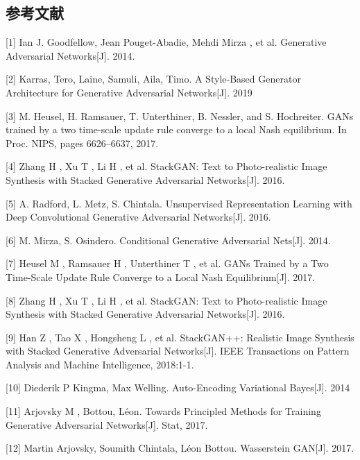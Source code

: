 \documentclass{article}
\begin{document}
\begin{CJK*}{UTF8}{gbsn}
\section*{参考文献}

\small

[1] Ian J. Goodfellow, Jean Pouget-Abadie, Mehdi Mirza , et al. Generative Adversarial Networks[J]. 2014.

[2] Karras, Tero, Laine, Samuli, Aila, Timo. A Style-Based Generator Architecture for Generative Adversarial Networks[J]. 2019

[3] M. Heusel, H. Ramsauer, T. Unterthiner, B. Nessler, and S. Hochreiter. GANs trained by a two time-scale update rule converge to a local Nash equilibrium. In Proc. NIPS, pages 6626–6637, 2017.

[4] Zhang H , Xu T , Li H , et al. StackGAN: Text to Photo-realistic Image Synthesis with Stacked Generative Adversarial Networks[J]. 2016.

[5] A. Radford, L. Metz, S. Chintala. Unsupervised Representation Learning with Deep Convolutional Generative Adversarial Networks[J]. 2016.

[6] M. Mirza, S. Osindero. Conditional Generative Adversarial Nets[J]. 2014.

[7] Heusel M , Ramsauer H , Unterthiner T , et al. GANs Trained by a Two Time-Scale Update Rule Converge to a Local Nash Equilibrium[J]. 2017.

[8] Zhang H , Xu T , Li H , et al. StackGAN: Text to Photo-realistic Image Synthesis with Stacked Generative Adversarial Networks[J]. 2016.

[9] Han Z , Tao X , Hongsheng L , et al. StackGAN++: Realistic Image Synthesis with Stacked Generative Adversarial Networks[J]. IEEE Transactions on Pattern Analysis and Machine Intelligence, 2018:1-1.

[10] Diederik P Kingma, Max Welling. Auto-Encoding Variational Bayes[J]. 2014

[11] Arjovsky M , Bottou, Léon. Towards Principled Methods for Training Generative Adversarial Networks[J]. Stat, 2017.

[12] Martin Arjovsky, Soumith Chintala, Léon Bottou. Wasserstein GAN[J]. 2017.

\end{CJK*}
\end{document}
